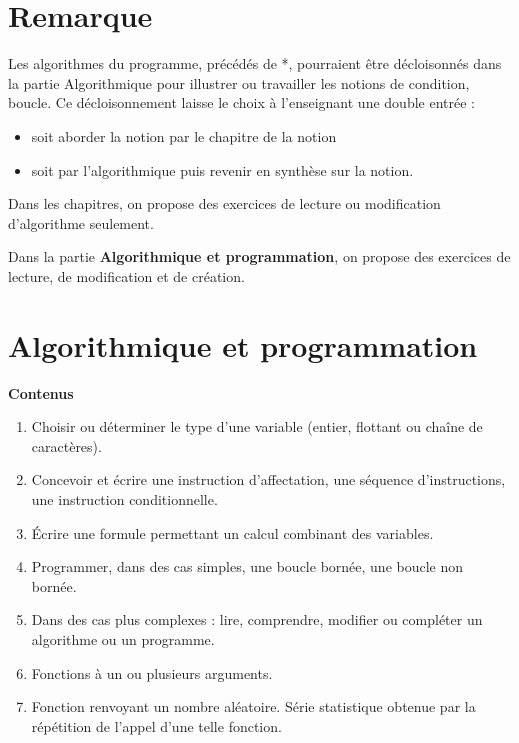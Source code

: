\documentclass[10pt,a4paper]{article}
\begin{document}
 


\section*{Remarque}

Les algorithmes du programme, précédés de *, pourraient être décloisonnés dans la partie Algorithmique pour illustrer ou travailler les notions de condition, boucle.
Ce décloisonnement laisse le choix à l'enseignant une double entrée : 
\begin{itemize}
\item soit aborder la notion par le chapitre de la notion
\item soit par l'algorithmique puis revenir en synthèse sur la notion.
\end{itemize}

Dans les chapitres, on propose des exercices de lecture ou modification d'algorithme seulement. 

Dans la partie \textbf{Algorithmique et programmation}, on propose des exercices de  lecture, de  modification et de création.


\section{Algorithmique et programmation}

\textbf{Contenus}

\begin{enumerate} 
\item  Choisir ou déterminer le type d'une variable (entier, flottant ou chaîne de caractères).
\item  Concevoir et écrire une instruction d'affectation, une séquence d'instructions, une 
instruction conditionnelle.
\item Écrire une formule permettant un calcul combinant des variables.
\item Programmer, dans des cas simples, une boucle bornée, une boucle non bornée.
\item Dans des cas plus complexes : lire, comprendre, modifier ou compléter un algorithme 
ou un programme.
\item Fonctions à un ou plusieurs arguments.
\item Fonction renvoyant un nombre aléatoire. Série statistique obtenue par la répétition de 
l’appel d’une telle fonction.

\end{enumerate}
\end{document}
